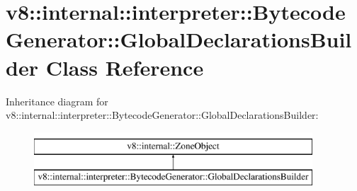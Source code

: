 \hypertarget{classv8_1_1internal_1_1interpreter_1_1BytecodeGenerator_1_1GlobalDeclarationsBuilder}{}\section{v8\+:\+:internal\+:\+:interpreter\+:\+:Bytecode\+Generator\+:\+:Global\+Declarations\+Builder Class Reference}
\label{classv8_1_1internal_1_1interpreter_1_1BytecodeGenerator_1_1GlobalDeclarationsBuilder}
Inheritance diagram for v8\+:\+:internal\+:\+:interpreter\+:\+:Bytecode\+Generator\+:\+:Global\+Declarations\+Builder\+:\begin{figure}[H]
\begin{center}
\leavevmode
\includegraphics[height=2.000000cm]{classv8_1_1internal_1_1interpreter_1_1BytecodeGenerator_1_1GlobalDeclarationsBuilder}
\end{center}
\end{figure}
